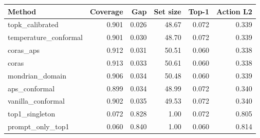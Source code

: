 \begin{tabular}{lrrrrr}
\toprule
Method & Coverage & Gap & Set size & Top-1 & Action L2 \\
\midrule
topk\_calibrated & 0.901 & 0.026 & 48.67 & 0.072 & 0.339 \\
temperature\_conformal & 0.901 & 0.030 & 48.70 & 0.072 & 0.339 \\
coras\_aps & 0.912 & 0.031 & 50.51 & 0.060 & 0.338 \\
coras & 0.913 & 0.033 & 50.61 & 0.060 & 0.338 \\
mondrian\_domain & 0.906 & 0.034 & 50.48 & 0.060 & 0.339 \\
aps\_conformal & 0.899 & 0.034 & 48.99 & 0.072 & 0.340 \\
vanilla\_conformal & 0.902 & 0.035 & 49.53 & 0.072 & 0.340 \\
top1\_singleton & 0.072 & 0.828 & 1.00 & 0.072 & 0.805 \\
prompt\_only\_top1 & 0.060 & 0.840 & 1.00 & 0.060 & 0.814 \\
\bottomrule
\end{tabular}